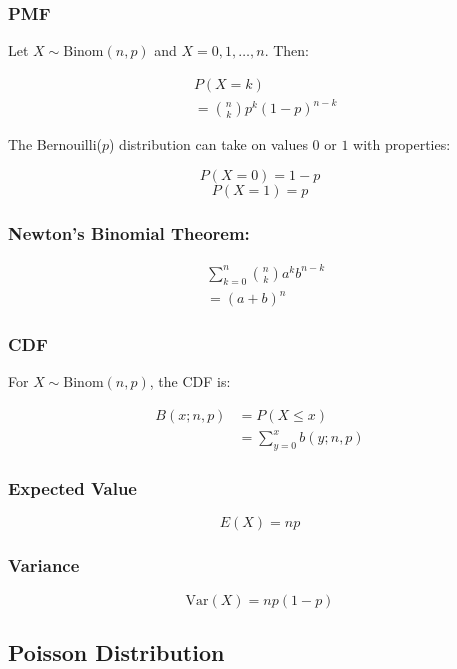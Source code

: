\subsubsection*{PMF}

Let $X \sim \text{Binom}(n,p)$ and $X = 0,1,\dots,n$. Then:

\begin{align*}
       & P(X = k)                       \\
       & = \binom{n}{k} p^k (1-p)^{n-k}
\end{align*}

The Bernouilli($p$) distribution can take on values $0$ or $1$ with properties:

$$ P(X = 0) = 1 - p $$
$$ P(X = 1) = p $$

\subsubsection*{Newton's Binomial Theorem:}

\begin{align*}
       & \sum_{k=0}^n \binom{n}{k} a^k b^{n-k} \\
       & =(a + b)^n
\end{align*}

\subsubsection*{CDF}

For $X\sim \text{Binom}(n,p)$, the CDF is:

\begin{align*}
      B(x;n,p) & = P(X \leq x)           \\
               & = \sum_{y=0}^x b(y;n,p)
\end{align*}

\subsubsection*{Expected Value}

$$ E(X) = np $$

\subsubsection*{Variance}

$$ \text{Var}(X) = np(1-p) $$

\subsection*{Poisson Distribution}

